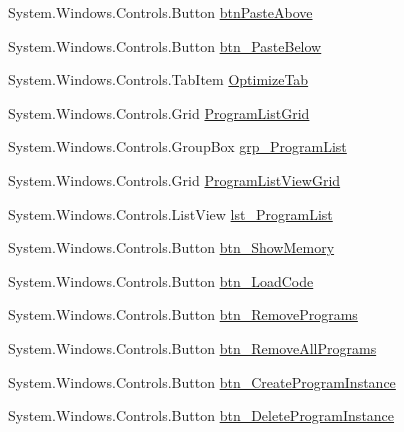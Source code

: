 \begin{DoxyCompactItemize}
\item 
System.\+Windows.\+Controls.\+Button \hyperlink{class_c_p_u___o_s___simulator_1_1_main_window_ae2ef9b73d0b5776415c7f3e91c1eaf21}{btn\+Paste\+Above}
\item 
System.\+Windows.\+Controls.\+Button \hyperlink{class_c_p_u___o_s___simulator_1_1_main_window_a1c24521ff648d75bf5991567e1a85b55}{btn\+\_\+\+Paste\+Below}
\item 
System.\+Windows.\+Controls.\+Tab\+Item \hyperlink{class_c_p_u___o_s___simulator_1_1_main_window_a47b1359d9e96abf2b0935eb3392405d4}{Optimize\+Tab}
\item 
System.\+Windows.\+Controls.\+Grid \hyperlink{class_c_p_u___o_s___simulator_1_1_main_window_adb8397cdbc794d18b0379ba7251d2278}{Program\+List\+Grid}
\item 
System.\+Windows.\+Controls.\+Group\+Box \hyperlink{class_c_p_u___o_s___simulator_1_1_main_window_a0ccd227c10c9a0878095ef10c0ff92b7}{grp\+\_\+\+Program\+List}
\item 
System.\+Windows.\+Controls.\+Grid \hyperlink{class_c_p_u___o_s___simulator_1_1_main_window_a4e287cef9f0becaebe0777af8de2d8c9}{Program\+List\+View\+Grid}
\item 
System.\+Windows.\+Controls.\+List\+View \hyperlink{class_c_p_u___o_s___simulator_1_1_main_window_ab33f21e0f19eab104e6f67f44d89daeb}{lst\+\_\+\+Program\+List}
\item 
System.\+Windows.\+Controls.\+Button \hyperlink{class_c_p_u___o_s___simulator_1_1_main_window_af2d1c3293ffaa1d203a9bdb8bf282eab}{btn\+\_\+\+Show\+Memory}
\item 
System.\+Windows.\+Controls.\+Button \hyperlink{class_c_p_u___o_s___simulator_1_1_main_window_aaa08339ccd746254bf2429cae1fe8921}{btn\+\_\+\+Load\+Code}
\item 
System.\+Windows.\+Controls.\+Button \hyperlink{class_c_p_u___o_s___simulator_1_1_main_window_a7ec7ff768bad67e92cfcee280f24a4fb}{btn\+\_\+\+Remove\+Programs}
\item 
System.\+Windows.\+Controls.\+Button \hyperlink{class_c_p_u___o_s___simulator_1_1_main_window_a0a15b704eecd6f89bffcf40337817ee7}{btn\+\_\+\+Remove\+All\+Programs}
\item 
System.\+Windows.\+Controls.\+Button \hyperlink{class_c_p_u___o_s___simulator_1_1_main_window_afd63a7da59cbd27226ff97e57cca47f6}{btn\+\_\+\+Create\+Program\+Instance}
\item 
System.\+Windows.\+Controls.\+Button \hyperlink{class_c_p_u___o_s___simulator_1_1_main_window_a2739992a53fa92c833a59cfa0b34ffb2}{btn\+\_\+\+Delete\+Program\+Instance}

\end{DoxyCompactItemize}
